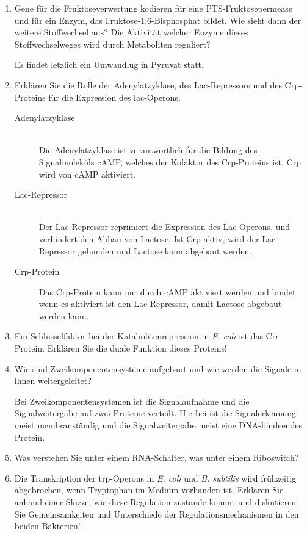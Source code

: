 \begin{enumerate}
	\item Gene für die Fruktoseverwertung kodieren für eine PTS-Fruktosepermease und für ein Enzym, das Fruktose-1,6-Bisphosphat bildet. Wie sieht dann der weitere Stoffwechsel aus? Die Aktivität welcher Enzyme dieses Stoffwechselweges wird durch Metaboliten reguliert?

		Es findet letzlich ein Umwandlug in Pyruvat statt.

	\item Erklären Sie die Rolle der Adenylatzyklase, des Lac-Repressors und des Crp-Proteins für die Expression des lac-Operons.

		\begin{description}
			\item[Adenylatzyklase] \hfill \\
				Die Adenylatzyklase ist verantwortlich für die Bildung des Signalmoleküls cAMP,
				welches der Kofaktor des Crp-Proteins ist.
				Crp wird von cAMP aktiviert.
			\item[Lac-Repressor] \hfill \\
				Der Lac-Repressor reprimiert die Expression des Lac-Operons,
				und verhindert den Abbau von Lactose.
				Ist Crp aktiv, wird der Lac-Repressor gebunden
				und Lactose kann abgebaut werden.
			\item[Crp-Protein] \hfill 
				Das Crp-Protein kann nur durch cAMP aktiviert werden 
				und bindet wenn es aktiviert ist den Lac-Repressor,
				damit Lactose abgebaut werden kann.
		\end{description}

	\item Ein Schlüsselfaktor bei der Katabolitenrepression in \emph{E. coli} ist das Crr Protein. Erklären Sie die duale Funktion dieses Proteins!
	\item Wie sind Zweikomponentensysteme aufgebaut und wie werden die Signale in ihnen weitergeleitet?

		Bei Zweikomponentensystemen ist die Signalaufnahme und die Signalweitergabe auf zwei Proteine verteilt.
		Hierbei ist die Signalerkennung meist membranständig und die Signalweitergabe meist eine DNA-bindeendes Protein.

	\item Was verstehen Sie unter einem RNA-Schalter, was unter einem Riboswitch?
	\item Die Transkription der trp-Operons in \emph{E. coli} und \emph{B. subtilis} wird frühzeitig abgebrochen, wenn Tryptophan im Medium vorhanden ist. Erklären Sie anhand einer Skizze, wie diese Regulation zustande kommt und diskutieren Sie Gemeinsamkeiten und Unterschiede der Regulationsmechanismen in den beiden Bakterien!
\end{enumerate}
